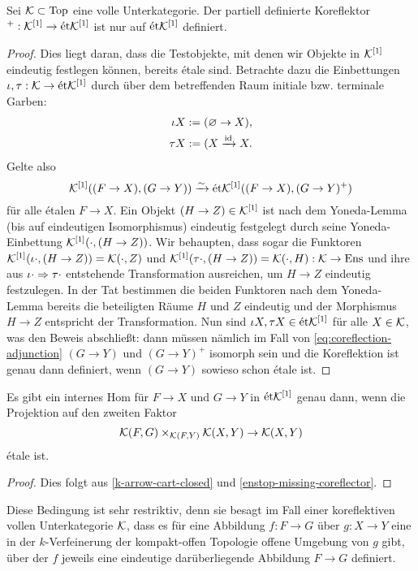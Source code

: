 \begin{satz} \label{enstop-missing-coreflector}
  Sei $\mathcal{K} \subset \operatorname{Top}$ eine volle Unterkategorie. Der partiell
  definierte Koreflektor $^+: \mathcal{K}^{[1]} \to \mathrm{\acute{e}t} \mathcal{K}^{[1]}$ ist nur auf
  $\mathrm{\acute{e}t} \mathcal{K}^{[1]}$ definiert.
\end{satz}
\begin{proof}
  Dies liegt daran, dass die Testobjekte, mit denen wir Objekte in
  $\mathcal{K}^{[1]}$ eindeutig festlegen können, bereits étale sind. Betrachte
  dazu die Einbettungen $\iota, \tau: \mathcal{K} \to \mathrm{\acute{e}t} \mathcal{K}^{[1]}$ durch über
  dem betreffenden Raum initiale bzw. terminale Garben:
  \begin{align*}
    \iota X := (\varnothing \to X), \\
    \tau X := (X \xrightarrow{\operatorname{id}} X.
  \end{align*}
  Gelte also
  \begin{equation} \label{eq:coreflection-adjunction}
    \mathcal{K}^{[1]}((F \to X), (G \to Y)) \xrightarrow[]{\sim} \mathrm{\acute{e}t} \mathcal{K}^{[1]}((F \to X), (G \to Y)^+)
  \end{equation}
  für alle étalen $F \to X$. Ein Objekt $(H \to Z) \in \mathcal{K}^{[1]}$ ist
  nach dem Yoneda-Lemma (bis auf eindeutigen Isomorphismus) eindeutig
  festgelegt durch seine Yoneda-Einbettung $\mathcal{K}^{[1]}(\cdot, (H \to
  Z))$. Wir behaupten, dass sogar die Funktoren $\mathcal{K}^{[1]}(\iota \cdot,
  (H \to Z)) = \mathcal{K}(\cdot, Z)$ und $\mathcal{K}^{[1]}(\tau \cdot, (H \to Z)) =
  \mathcal{K}(\cdot, H): \mathcal{K} \to \operatorname{Ens}$ und ihre aus $\iota \cdot \Rightarrow \tau
  \cdot$ entstehende Transformation ausreichen, um $H \to Z$ eindeutig
  festzulegen. In der Tat bestimmen die beiden Funktoren nach dem
  Yoneda-Lemma bereits die beteiligten Räume $H$ und $Z$ eindeutig und
  der Morphismus $H \to Z$ entspricht der Transformation. Nun sind
  $\iota X, \tau X \in \mathrm{\acute{e}t} \mathcal{K}^{[1]}$ für alle $X \in \mathcal{K}$, was den
  Beweis abschließt: dann müssen nämlich im Fall von
  \ref{eq:coreflection-adjunction} $(G \to Y)$ und $(G \to Y)^+$
  isomorph sein und die Koreflektion ist genau dann definiert, wenn
  $(G \to Y)$ sowieso schon étale ist.
\end{proof}
\begin{kor}
  Es gibt ein internes Hom für $F \to X$ und $G \to Y$ in $\mathrm{\acute{e}t}
  \mathcal{K}^{[1]}$ genau dann, wenn die Projektion auf den zweiten Faktor
  \[ \mathcal{K}(F, G) \times_{\mathcal{K}(F, Y)} \mathcal{K}(X, Y) \to \mathcal{K}(X, Y) \]
  étale ist.
\end{kor}
\begin{proof}
  Dies folgt aus \ref{k-arrow-cart-closed} und
  \ref{enstop-missing-coreflector}.
\end{proof}
\begin{bem}
  Diese Bedingung ist sehr restriktiv, denn sie besagt im Fall einer
  koreflektiven vollen Unterkategorie $\mathcal{K}$, dass es für eine Abbildung
  $f: F \to G$ über $g: X \to Y$ eine in der $k$-Verfeinerung der
  kompakt-offen Topologie offene Umgebung von $g$ gibt, über der $f$
  jeweils eine eindeutige darüberliegende Abbildung $F \to G$
  definiert.
\end{bem}

